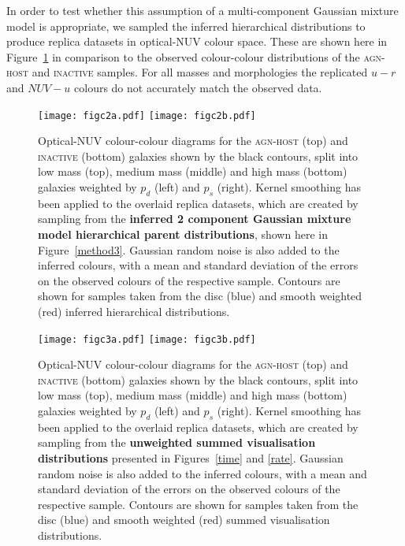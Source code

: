 \documentclass[useAMS,usenatbib]{mn2e}
\begin{document}
{In order to test whether this assumption of a multi-component Gaussian mixture model is appropriate, we sampled the inferred hierarchical distributions to produce replica datasets in optical-NUV colour space. These are shown here in Figure~\ref{replica}  in comparison to the observed colour-colour distributions of the \textsc{agn-host} and \textsc{inactive} samples. For all masses and morphologies the replicated $u-r$ and $NUV-u$ colours do not accurately match the observed data. 

\begin{figure}
\begin{centering}
\texttt{[image: figc2a.pdf]}
\texttt{[image: figc2b.pdf]}
\caption[8pt]{Optical-NUV colour-colour diagrams for the \textsc{agn-host} (top) and \textsc{inactive} (bottom) galaxies shown by the black contours, split into low mass (top), medium mass (middle) and high mass (bottom) galaxies weighted by $p_d$ (left) and $p_s$ (right). Kernel smoothing has been applied to the overlaid replica datasets, which are created by sampling from the \textbf{inferred 2 component Gaussian mixture model hierarchical parent distributions}, shown here in Figure~\ref{method3}. Gaussian random noise is also added to the inferred colours, with a mean and standard deviation of the errors on the observed colours of the respective sample. Contours are shown for samples taken from the disc (blue) and smooth weighted (red) inferred hierarchical distributions.
}
\label{replica}
\end{centering}
\end{figure}

\begin{figure}
\begin{centering}
\texttt{[image: figc3a.pdf]}
\texttt{[image: figc3b.pdf]}
\caption[8pt]{Optical-NUV colour-colour diagrams for the \textsc{agn-host} (top) and \textsc{inactive} (bottom) galaxies shown by the black contours, split into low mass (top), medium mass (middle) and high mass (bottom) galaxies weighted by $p_d$ (left) and $p_s$ (right). Kernel smoothing has been applied to the overlaid replica datasets, which are created by sampling from the \textbf{unweighted summed visualisation distributions} presented in Figures~\ref{time} and \ref{rate}. Gaussian random noise is also added to the inferred colours, with a mean and standard deviation of the errors on the observed colours of the respective sample. Contours are shown for samples taken from the disc (blue) and smooth weighted (red) summed visualisation distributions.
}
\label{replicapop}
\end{centering}
\end{figure}

}
\end{document}
